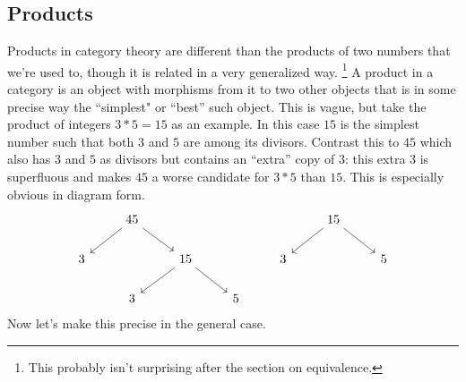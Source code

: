 \documentclass[12pt]{article}
\theoremstyle{definition}
\begin{document}
\subsection*{Products}
Products in category theory are different than the products of two numbers that we're used to, though it is related in a very generalized way.
\footnote{This probably isn't surprising after the section on equivalence.}
A product in a category is an object with morphisms from it to two other objects that is in some precise way the ``simplest" or ``best'' such object.
This is vague, but take the product of integers $3*5=15$ as an example.
In this case $15$ is the simplest number such that both $3$ and $5$ are among its divisors.
Contrast this to $45$ which also has $3$ and $5$ as divisors but contains an ``extra'' copy of $3$: this extra $3$ is superfluous and makes $45$ a worse candidate for $3*5$ than $15$.
This is especially obvious in diagram form.
\[\begin{tikzcd}
        & 45 &&&& 15 \\
        3 && 15 && 3 && 5 \\
        & 3 && 5
        \arrow[from=1-2, to=2-1]
        \arrow[from=1-6, to=2-5]
        \arrow[from=1-6, to=2-7]
        \arrow[from=1-2, to=2-3]
        \arrow[from=2-3, to=3-2]
        \arrow[from=2-3, to=3-4]
    \end{tikzcd}\]
Now let's make this precise in the general case.
\end{document}
